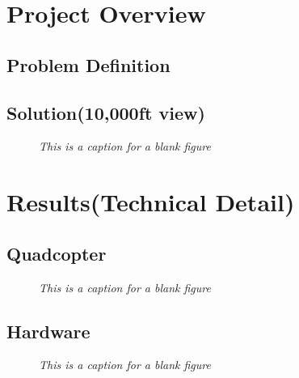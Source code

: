 \documentclass[11pt]{article}
\begin{document}
\pagebreak

\tableofcontents

\pagebreak

\listoffigures

\pagebreak

\section{Project Overview}
\blindtext
\subsection{Problem Definition}
\blindtext
\subsection{Solution(10,000ft view)}
\blindtext

    \begin{figure}[H]
	\centering	
	\caption{\textit{This is a caption for a blank figure}}	
	\end{figure}


\section{Results(Technical Detail)}
\subsection{Quadcopter}

\blindtext

    \begin{figure}[H]
	\centering	
	\caption{\textit{This is a caption for a blank figure}}	
	\end{figure}

\subsection{Hardware}

\blindtext

    \begin{figure}[H]
	\centering	
	\caption{\textit{This is a caption for a blank figure}}	
	\end{figure}
\end{document}
